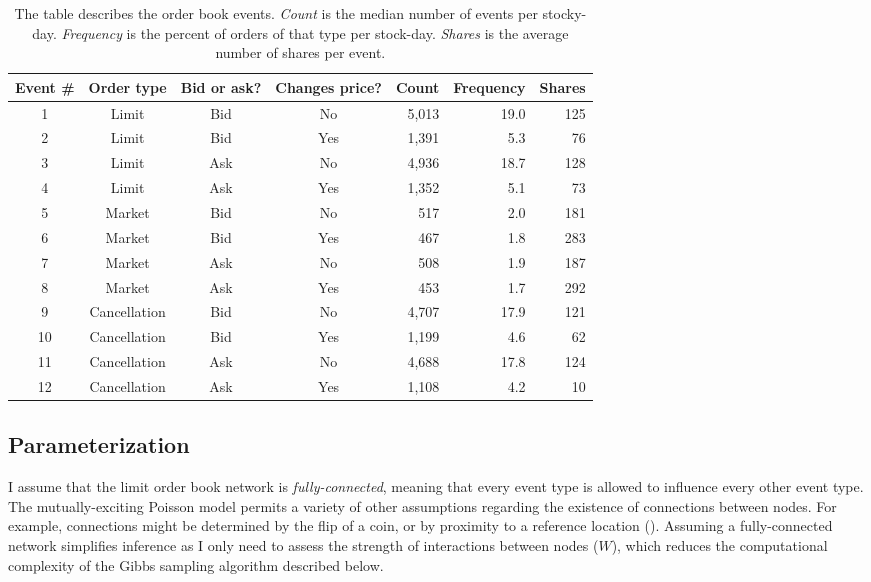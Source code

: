 		\begin{table}[t]
		\small
		\linespread{1}
		\centering
		\captionsetup{position=below, font=footnotesize, justification=justified, width=\linewidth}
		\caption[Order book event definitions]{The table describes the order book events. \textit{Count} is the median number of events per stocky-day. \textit{Frequency} is the percent of orders of that type per stock-day. \textit{Shares} is the average number of shares per event.}
		\label{tab:event_definitions}
		\begin{tabular*}{\textwidth}{@{\extracolsep{\fill}}ccccrrr}
		\toprule
		Event \# & Order type & Bid or ask? & Changes price? & Count & Frequency & Shares \\
		\midrule
		1 & Limit & Bid & No & 5,013 & 19.0 & 125 \\
		2 & Limit & Bid & Yes & 1,391 & 5.3 & 76 \\
		3 & Limit & Ask & No & 4,936 & 18.7 & 128 \\
		4 & Limit & Ask & Yes & 1,352 & 5.1 & 73 \\  %
		5 & Market & Bid & No & 517 & 2.0 & 181 \\   %
		6 & Market & Bid & Yes & 467 & 1.8 & 283 \\  %
		7 & Market & Ask & No & 508 & 1.9 & 187 \\   %
		8 & Market & Ask & Yes & 453 & 1.7 & 292 \\
		9 & Cancellation & Bid & No & 4,707 & 17.9 & 121 \\
		10 & Cancellation & Bid & Yes & 1,199 & 4.6 & 62 \\
		11 & Cancellation & Ask & No & 4,688 & 17.8 & 124 \\
		12 & Cancellation & Ask & Yes & 1,108 & 4.2 & 10 \\
		\bottomrule
		\end{tabular*}
		\end{table}

	\subsection{Parameterization}
		I assume that the limit order book network is \textit{fully-connected}, meaning that every event type is allowed to influence every other event type. The mutually-exciting Poisson model permits a variety of other assumptions regarding the existence of connections between nodes. For example, connections might be determined by the flip of a coin, or by proximity to a reference location (\cite{Linderman2015}). Assuming a fully-connected network simplifies inference as I only need to assess the strength of interactions between nodes ($W$), which reduces the computational complexity of the Gibbs sampling algorithm described below.

